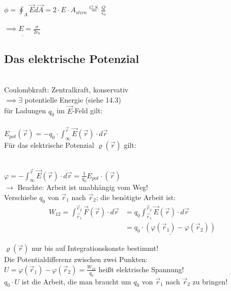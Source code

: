 \documentclass[11pt]{article}
\begin{document}
$ \phi=\oint_{A} \vec{E}d\vec{A}=2\cdot E\cdot A_{stirn}\overset{G.S.}{=}\frac{Q}{\epsilon_0}$ 

$ \underline{\implies E=\frac{\sigma}{2\epsilon_0}} $

\subsection{Das elektrische Potenzial}\\

Coulombkraft: Zentralkraft, konservativ\\
$\implies \exists$ potentielle Energie (siehe 14.3)\\
für Ladungen $q_0$ im $\vec{E}$-Feld gilt:\\

\hfill\\
$\boxed{\displaystyle E_{pot}(\vec{r})=-q_0\cdot\int_{\infty}^{\vec{r}} \vec{E}(\vec{r})\cdot d\vec{r}}$
\hfill\\

Für das elektrische Potenzial $ \varrho(\vec{r}) $ gilt:

\hfill\\
$\boxed{\displaystyle\varphi=-\int_{\infty}^{\vec{r}} \vec{E}(\vec{r})\cdot d\vec{r} = \frac{1}{q_0}E_{pot}\cdot (\vec{r})}$
\hfill\\

$\rightarrow$ Beachte: Arbeit ist unabhängig vom Weg!\\
Verschiebe $q_0$ von $\vec{r}_1$ nach $\vec{r}_2$; die benötigte Arbeit ist:\\

\begin{align*}
	\displaystyle W_{12}= \int_{\vec{r}_1}^{\vec{r}_2} \vec{F}(\vec{r})\cdot d\vec{r} & = q_0\int_{\vec{r}_1}^{\vec{r}_2} \vec{E}(\vec{r})\cdot d\vec{r} \\
	&\underline{ =q_0\cdot(\varphi(\vec{r}_1)-\varphi(\vec{r}_2))}
\end{align*}

$ \varrho(\vec{r}) $ nur bis auf Integrationskonste bestimmt!\\
Die Potentialdifferenz zwischen zwei Punkten:\\

$ U = \varphi(\vec{r}_1)-\varphi(\vec{r}_2) = \frac{W_{12}}{q_0}$ heißt elektrische Spannung!\\

$q_0\cdot U$ ist die Arbeit, die man braucht um $q_0$ von $ \vec{r}_1 $ nach $ \vec{r}_2 $ zu bringen!\\
\end{document}
